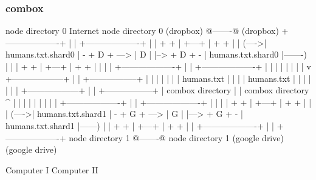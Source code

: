 \begin{frame}[fragile]
  \frametitle{combox}

  {\tiny
  \begin{semiverbatim}

         node directory 0                Internet              node directory 0
         (dropbox)                       @-------@             (dropbox)
        +-------------------+            |       |            +-------------------+
        |                   |    + +     | +---+ |     + +    |                   |
  (---->| humans.txt.shard0 | - + D + ---> | D | |--> + D + - | humans.txt.shard0 |-------)
  |     |                   |    + +     | +---+ |     + +    |                   |       |
  |     +-------------------+            |       |            +-------------------+       |
  |                                      |       |                                        |
  |                                      |       |                                        v
 +------------------+                    |       |                        +-----------------+
 |                  |                    |       |                        |                 |
 |  humans.txt      |                    |       |                        | humans.txt      |
 |                  |                    |       |                        |                 |
 +------------------+                    |       |                        +-----------------+
  |  combox directory                    |       |                      combox directory  ^
  |                                      |       |                                        |
  |                                      |       |                                        |
  |     +-------------------+            |       |             +-------------------+      |
  |     |                   |    + +     | +---+ |      + +    |                   |      |
  (---->| humans.txt.shard1 | - + G + ---> | G | |---> + G + - | humans.txt.shard1 |------)
        |                   |    + +     | +---+ |      + +    |                   |
        +-------------------+            |       |             +-------------------+
         node directory 1                @-------@              node directory 1
         (google drive)                                         (google drive)

  Computer I                                                                    Computer II
  \end{semiverbatim}
  }

\end{frame}